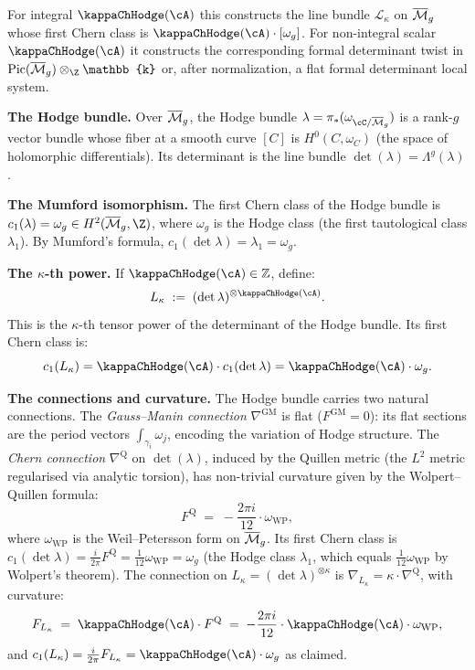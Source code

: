 \begin{construction}
\label{constr:determinant-line-bundle}

For integral $\kappaChHodge(\cA)$ this constructs the line bundle
$\mathcal{L}_\kappa$ on $\overline{\mathcal M}_g$ whose first Chern class is
$\kappaChHodge(\cA)\cdot[\omega_g]$. For non-integral scalar
$\kappaChHodge(\cA)$ it constructs the corresponding formal determinant twist
in $\mathrm{Pic}(\overline{\cM}_g)\otimes_{\Z}\mathbb{k}$ or,
after normalization, a flat formal determinant local system.

\textbf{The Hodge bundle.}
Over $\overline{\mathcal M}_g$, the Hodge bundle $\lambda = \pi_*(\omega_{\cC/\overline{\cM}_g})$ is a rank-$g$ vector bundle whose fiber at a smooth curve $[C]$ is $H^0(C, \omega_C)$ (the space of holomorphic differentials). Its determinant is the line bundle $\det(\lambda) = \Lambda^g(\lambda)$.

\textbf{The Mumford isomorphism.}
The first Chern class of the Hodge bundle is $c_1(\lambda) = \omega_g \in H^2(\overline{\cM}_g, \Z)$, where $\omega_g$ is the Hodge class (the first tautological class $\lambda_1$). By Mumford's formula, $c_1(\det \lambda) = \lambda_1 = \omega_g$.

\textbf{The $\kappa$-th power.}
If $\kappaChHodge(\cA)\in\mathbb Z$, define:
\[
 L_\kappa \;:=\; (\det \lambda)^{\otimes \kappaChHodge(\cA)}.
\]
This is the $\kappa$-th tensor power of the determinant of the Hodge bundle. Its first Chern class is:
\[
 c_1(L_\kappa) = \kappaChHodge(\cA) \cdot c_1(\det \lambda) = \kappaChHodge(\cA) \cdot \omega_g.
\]

\textbf{The connections and curvature.}
The Hodge bundle carries two natural connections. The \emph{Gauss--Manin connection} $\nabla^{\mathrm{GM}}$ is flat ($F^{\mathrm{GM}} = 0$): its flat sections are the period vectors $\int_{\gamma_i} \omega_j$, encoding the variation of Hodge structure. The \emph{Chern connection} $\nabla^{\mathrm{Q}}$ on $\det(\lambda)$, induced by the Quillen metric (the $L^2$ metric regularised via analytic torsion), has non-trivial curvature given by the Wolpert--Quillen formula:
\[
 F^{\mathrm{Q}} \;=\; -\frac{2\pi i}{12} \cdot \omega_{\mathrm{WP}},
\]
where $\omega_{\mathrm{WP}}$ is the Weil--Petersson form on $\overline{\mathcal M}_g$. Its first Chern class is $c_1(\det\lambda) = \frac{i}{2\pi}F^{\mathrm{Q}} = \frac{1}{12}\omega_{\mathrm{WP}} = \omega_g$ (the Hodge class $\lambda_1$, which equals $\frac{1}{12}\omega_{\mathrm{WP}}$ by Wolpert's theorem). The connection on $L_\kappa = (\det\lambda)^{\otimes\kappa}$ is $\nabla_{L_\kappa} = \kappa \cdot \nabla^{\mathrm{Q}}$, with curvature:
\[
 F_{L_\kappa}
 \;=\; \kappaChHodge(\cA) \cdot F^{\mathrm{Q}}
 \;=\; -\frac{2\pi i}{12} \cdot \kappaChHodge(\cA) \cdot \omega_{\mathrm{WP}},
\]
and $c_1(L_\kappa) = \frac{i}{2\pi} F_{L_\kappa} = \kappaChHodge(\cA) \cdot \omega_g$ as claimed.


\end{construction}

